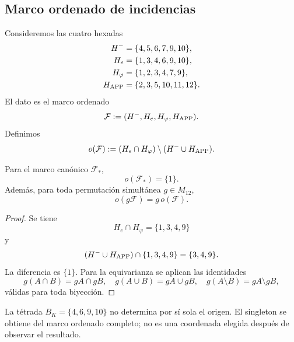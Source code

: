 \subsection{Marco ordenado de incidencias}

Consideremos las cuatro hexadas
\begin{align}
 H^-&=\{4,5,6,7,9,10\},
 \label{p12-83-c20-s5:eq:hexada-marco-negativa}\\
 H_e&=\{1,3,4,6,9,10\},
 \label{p12-83-c20-s5:eq:hexada-marco-e}\\
 H_\varphi&=\{1,2,3,4,7,9\},
 \label{p12-83-c20-s5:eq:hexada-marco-phi}\\
 H_{\rm APP}&=\{2,3,5,10,11,12\}.
 \label{p12-83-c20-s5:eq:hexada-marco-app}
\end{align}
El dato es el marco ordenado
\begin{equation}
 \mathcal F:=(H^-,H_e,H_\varphi,H_{\rm APP}).
 \label{p12-83-c20-s5:eq:marco-incidencial-ordenado}
\end{equation}
Definimos
\begin{equation}
 o(\mathcal F)
 :=(H_e\cap H_\varphi)\setminus(H^-\cup H_{\rm APP}).
 \label{p12-83-c20-s5:eq:operador-origen-incidencial}
\end{equation}

\begin{theorem}
\label{p12-83-c20-s5:thm:origen-incidencial-equivariante}
Para el marco canónico \(\mathcal F_*\),
\begin{equation}
 \boxed{o(\mathcal F_*)=\{1\}.}
 \label{p12-83-c20-s5:eq:origen-incidencial-singleton}
\end{equation}
Además, para toda permutación simultánea \(g\in M_{12}\),
\begin{equation}
 o(g\mathcal F)=g\,o(\mathcal F).
 \label{p12-83-c20-s5:eq:equivarianza-origen-incidencial}
\end{equation}
\end{theorem}

\begin{proof}
Se tiene
\[
 H_e\cap H_\varphi=\{1,3,4,9\}
\]
y
\[
 (H^-\cup H_{\rm APP})\cap\{1,3,4,9\}=\{3,4,9\}.
\]
La diferencia es \(\{1\}\). Para la equivarianza se aplican las
identidades
\[
 g(A\cap B)=gA\cap gB,
 \quad
 g(A\cup B)=gA\cup gB,
 \quad
 g(A\setminus B)=gA\setminus gB,
\]
válidas para toda biyección.
\end{proof}

La tétrada \(B_K=\{4,6,9,10\}\) no determina por sí sola el origen. El
singleton se obtiene del marco ordenado completo; no es una coordenada
elegida después de observar el resultado.

